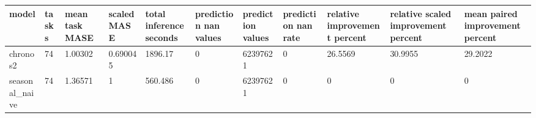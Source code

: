 \begin{tabular}{lllllllllll}
\toprule
model & tasks & mean task MASE & scaled MASE & total inference seconds & prediction nan values & prediction values & prediction nan rate & relative improvement percent & relative scaled improvement percent & mean paired improvement percent \\
\midrule
chronos2 & 74 & 1.00302 & 0.690045 & 1896.17 & 0 & 62397621 & 0 & 26.5569 & 30.9955 & 29.2022 \\
seasonal\_naive & 74 & 1.36571 & 1 & 560.486 & 0 & 62397621 & 0 & 0 & 0 & 0 \\
\bottomrule
\end{tabular}
